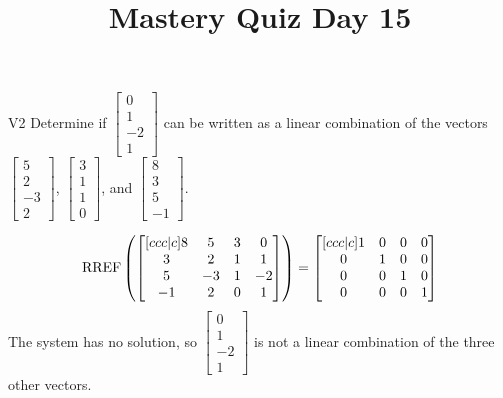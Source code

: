 \documentclass{sbgLAquiz}
\title{Mastery Quiz Day 15 }
\begin{document}
\begin{problem}{V2}
Determine if $\begin{bmatrix} 0 \\ 1 \\ -2 \\ 1 \end{bmatrix}$ can be written as a linear combination of the vectors $\begin{bmatrix} 5 \\ 2 \\ -3 \\ 2 \end{bmatrix}$, $\begin{bmatrix} 3 \\ 1 \\ 1 \\ 0 \end{bmatrix}$, and $\begin{bmatrix} 8 \\ 3 \\ 5 \\ -1 \end{bmatrix}$.
\end{problem}
\begin{solution}

$$\operatorname{RREF} \left(\begin{bmatrix}[ccc|c] 8 & 5 & 3 & 0\\ 3 & 2 & 1 & 1 \\ 5 & -3 & 1 & -2  \\ -1 & 2 & 0 & 1 \end{bmatrix} \right) = \begin{bmatrix}[ccc|c] 1 & 0 & 0 & 0  \\ 0 &  1 & 0 & 0  \\ 0 & 0 & 1 & 0 \\ 0 & 0 & 0 & 1  \end{bmatrix}$$
The system has no solution, so $\begin{bmatrix} 0 \\ 1 \\ -2 \\ 1 \end{bmatrix}$ is not a linear combination of the three other vectors.
\end{solution}
\end{document}
